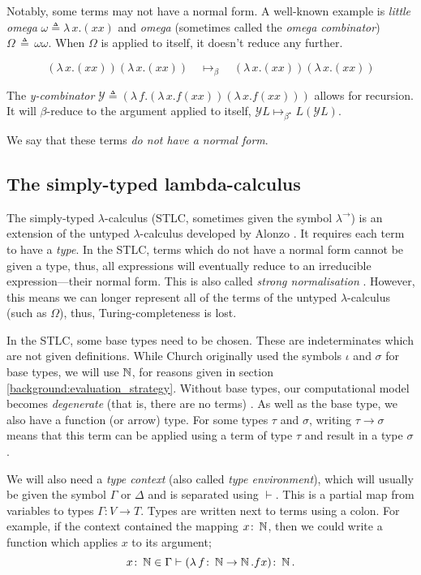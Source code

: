 Notably, some terms may not have a normal form. A well-known example is \textit{little omega}
$\omega \triangleq \lambda \, x. (x x)$ and \textit{omega} (sometimes called the \textit{omega
combinator}) $\Omega \, \triangleq \, \omega \omega$. When $\Omega$ is applied to itself, it doesn't
reduce any further.

\begin{equation*}
  (\lambda \, x. (x x)) (\lambda \, x. (x x)) \quad
  \mapsto_{\beta} \quad (\lambda \, x. (x x)) (\lambda \, x. (x x))
\end{equation*}

The \textit{y-combinator} $\mathcal{Y} \triangleq (\lambda \, f. (\lambda \, x. f (x x )) (\lambda
\, x. f (xx)))$ allows for recursion. It will $\beta$-reduce to the argument applied to itself,
$\mathcal{Y} L \mapsto_{\beta^{\star}} L (\mathcal{Y} L)$.

We say that these terms \textit{do not have a normal form}.

\subsection{The simply-typed lambda-calculus}
The simply-typed $\lambda$-calculus (STLC, sometimes given the symbol $\lambda^{\rightarrow}$) is an
extension of the untyped $\lambda$-calculus developed by Alonzo \citet{church_formulation_1940}. It
requires each term to have a \textit{type}. In the STLC, terms which do not have a normal form
cannot be given a type, thus, all expressions will eventually reduce to an irreducible
expression---their normal form. This is also called \textit{strong normalisation}
\citep{pierce_types_2002}. However, this means we can longer represent all of the terms of the
untyped $\lambda$-calculus (such as $\Omega$), thus, Turing-completeness is lost.

In the STLC, some base types need to be chosen. These are indeterminates which are not given
definitions. While Church originally used the symbols $\iota$ and $\sigma$ for base types, we will
use $\operatorname{\mathbb{N}}$, for reasons given in section \ref{background:evaluation_strategy}. Without base types,
our computational model becomes \textit{degenerate} (that is, there are no terms)
\citep{pierce_types_2002}. As well as the base type, we also have a function (or arrow) type. For
some types $\tau$ and $\sigma$, writing $\tau \to \sigma$ means that this term can be applied using
a term of type $\tau$ and result in a type $\sigma$.

We will also need a \textit{type context} (also called \textit{type environment}), which will
usually be given the symbol $\Gamma$ or $\Delta$ and is separated using $\vdash$. This is a partial
map from variables to types $\Gamma \colon V \to T$. Types are written next to terms using a colon.
For example, if the context contained the mapping $x \colon \operatorname{\mathbb{N}}$, then we could write a function
which applies $x$ to its argument;
\begin{equation*}
  x \colon \operatorname{\mathbb{N}} \in \Gamma \vdash (\lambda \, f \colon \operatorname{\mathbb{N}} \to \operatorname{\mathbb{N}} . f x) \colon \operatorname{\mathbb{N}}.
\end{equation*}

